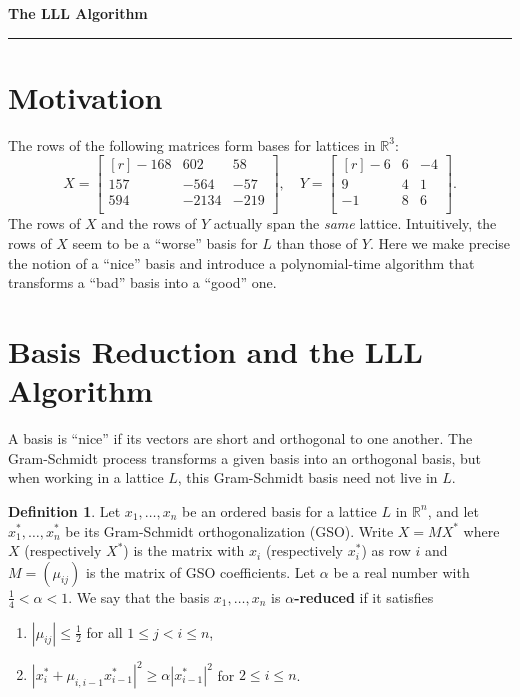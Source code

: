 \documentclass[11pt,letterpaper]{article}
\newcommand{\reals}{\mathbb{R}}
\theoremstyle{definition}
\newtheorem{definition}{Definition}[section]
\begin{document}
\begin{center}
{\bf \Large The LLL Algorithm} %
\vspace{0.2cm}
\hrule
\end{center}
%	
\section{Motivation}
The rows of the following matrices form bases for lattices in $\reals^3$:
\[
X = \begin{bmatrix*}[r]
	-168 & 602 & 58\\
	157 & -564 & -57\\
	594 & -2134 & -219\\
\end{bmatrix*}, \quad
Y = \begin{bmatrix*}[r]
	-6 & 6 & -4\\
	9 & 4 & 1\\
	-1 & 8 & 6\\
\end{bmatrix*}.
\]
The rows of $X$ and the rows of $Y$ actually span the \textit{same} lattice. Intuitively, the rows of $X$ seem to be a ``worse'' basis for $L$ than those of $Y$. Here we make precise the notion of a ``nice'' basis and introduce a polynomial-time algorithm that transforms a ``bad'' basis into a ``good'' one. 

\section{Basis Reduction and the LLL Algorithm}
A basis is ``nice'' if its vectors are short and orthogonal to one another. The Gram-Schmidt process transforms a given basis into an orthogonal basis, but when working in a lattice $L$, this Gram-Schmidt basis need not live in $L$.
\begin{definition}
	Let $x_1, \ldots, x_n$ be an ordered basis for a lattice $L$ in $\reals^n$, and let $x_1^*, \ldots, x_n^*$ be its Gram-Schmidt orthogonalization (GSO). Write $X = MX^*$ where $X$ (respectively $X^*$) is the matrix with $x_i$ (respectively $x_i^*$) as row $i$ and $M = (\mu_{ij})$ is the matrix of GSO coefficients. Let $\alpha$ be a real number with $\frac{1}{4}<\alpha<1$. We say that the basis $x_1, \ldots, x_n$ is \textbf{$\alpha$-reduced} if it satisfies
	\begin{enumerate}
		\item $|\mu_{ij}|\leq \frac{1}{2}$ for all $1\leq j<i\leq n$,
		\item $|x_i^* + \mu_{i, i-1}x_{i-1}^*|^2 \geq \alpha|x_{i-1}^*|^2$ for $2\leq i\leq n$.
	\end{enumerate}
\end{definition}
\end{document}
